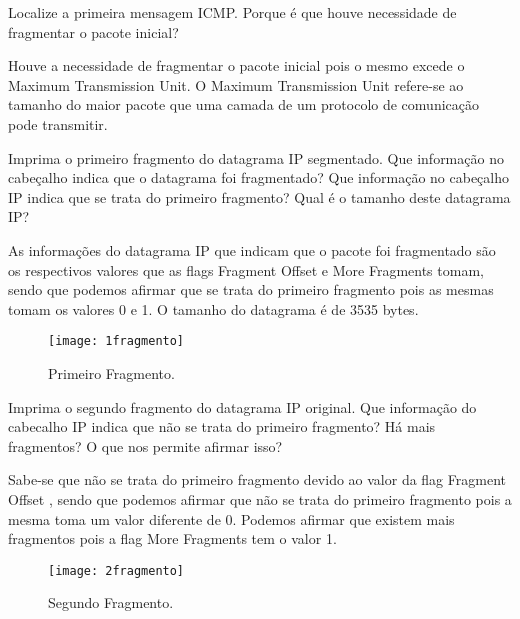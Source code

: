 \documentclass{exam}
\begin{document}
\begin{questions}

\question Localize a primeira mensagem ICMP. Porque é que houve necessidade de fragmentar o pacote inicial?
\begin{solution}[.2in]
Houve a necessidade de fragmentar o pacote inicial pois o mesmo excede o 
Maximum Transmission Unit. O Maximum Transmission Unit  refere-se ao tamanho 
do maior pacote que uma camada de um protocolo de comunicação pode 
transmitir. 
\end{solution}

\question Imprima o primeiro fragmento do datagrama IP segmentado. Que informação no 
cabeçalho indica que o datagrama foi fragmentado? Que informação no 
cabeçalho IP indica que se trata do primeiro fragmento? 
Qual é o tamanho deste datagrama IP?
\begin{solution}[.2in]
As informações do datagrama IP que indicam que o pacote foi fragmentado 
são os respectivos valores que as flags Fragment Offset e More Fragments
tomam, sendo que podemos afirmar que se trata do primeiro fragmento pois 
as mesmas tomam os valores 0 e 1. O tamanho do datagrama é de 3535 bytes.
\begin{figure}[H]
\centering\texttt{[image: 1fragmento]} 
\caption{\label{fig:controller}Primeiro Fragmento.}
\end{figure} 
\end{solution}

\question Imprima o segundo fragmento do datagrama IP original. Que 
informação do cabecalho IP indica que não se trata do primeiro fragmento?
Há mais fragmentos? O que nos permite afirmar isso?
\begin{solution}[.2in]
Sabe-se que não se trata do primeiro fragmento devido ao valor da flag 
Fragment Offset , sendo que podemos afirmar que não se trata do primeiro
fragmento pois a mesma toma um valor diferente de 0. Podemos afirmar 
que existem mais fragmentos pois a flag More Fragments tem o valor 1.
\begin{figure}[H]
\centering\texttt{[image: 2fragmento]} 
\caption{\label{fig:controller}Segundo Fragmento.}
\end{figure} 
\end{solution}


\end{questions}
\end{document}
